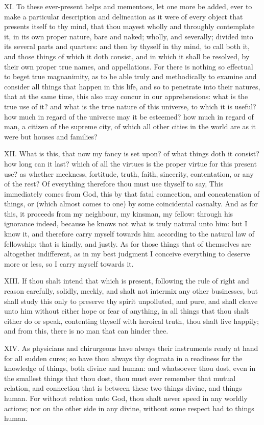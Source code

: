 XI. To these ever-present helps and mementoes, let one more be added,
ever to make a particular description and delineation as it were of every
object that presents itself to thy mind, that thou mayest wholly and
throughly contemplate it, in its own proper nature, bare and naked;
wholly, and severally; divided into its several parts and quarters: and
then by thyself in thy mind, to call both it, and those things of which it
doth consist, and in which it shall be resolved, by their own proper true
names, and appellations. For there is nothing so effectual to beget true
magnanimity, as to be able truly and methodically to examine and consider
all things that happen in this life, and so to penetrate into their
natures, that at the same time, this also may concur in our apprehensions:
what is the true use of it? and what is the true nature of this universe,
to which it is useful? how much in regard of the universe may it be
esteemed? how much in regard of man, a citizen of the supreme city, of
which all other cities in the world are as it were but houses and
families?

XII. What is this, that now my fancy is set upon? of what things doth
it consist? how long can it last? which of all the virtues is the proper
virtue for this present use? as whether meekness, fortitude, truth, faith,
sincerity, contentation, or any of the rest? Of everything therefore thou
must use thyself to say, This immediately comes from God, this by that
fatal connection, and concatenation of things, or (which almost comes to
one) by some coincidental casualty. And as for this, it proceeds from my
neighbour, my kinsman, my fellow: through his ignorance indeed, because he
knows not what is truly natural unto him: but I know it, and therefore
carry myself towards him according to the natural law of fellowship; that
is kindly, and justly. As for those things that of themselves are
altogether indifferent, as in my best judgment I conceive everything to
deserve more or less, so I carry myself towards it.

XIII. If thou shalt intend that which is present, following the rule of
right and reason carefully, solidly, meekly, and shalt not intermix any
other businesses, but shall study this only to preserve thy spirit
unpolluted, and pure, and shall cleave unto him without either hope or
fear of anything, in all things that thou shalt either do or speak,
contenting thyself with heroical truth, thou shalt live happily; and from
this, there is no man that can hinder thee.

XIV. As physicians and chirurgeons have always their instruments ready
at hand for all sudden cures; so have thou always thy dogmata in a
readiness for the knowledge of things, both divine and human: and
whatsoever thou dost, even in the smallest things that thou dost, thou
must ever remember that mutual relation, and connection that is between
these two things divine, and things human. For without relation unto God,
thou shalt never speed in any worldly actions; nor on the other side in
any divine, without some respect had to things human.

